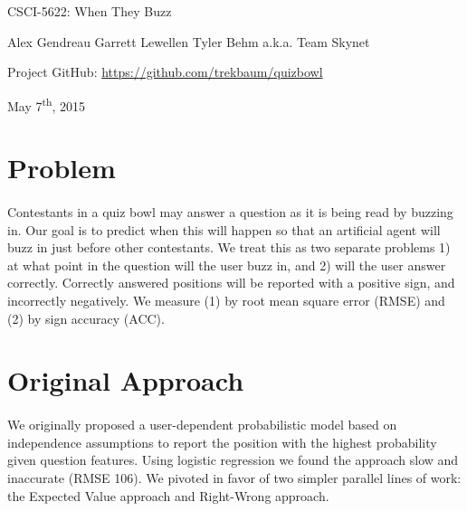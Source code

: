 \documentclass[letterpaper]{article}
\begin{document}
\begin{center}
\LARGE{CSCI-5622: When They Buzz}
\end{center}

\begin{center}
\large{$ $\hfill Alex Gendreau \hfill Garrett Lewellen \hfill Tyler Behm \hfill a.k.a. Team Skynet \hfill $ $}
\end{center}

\begin{center}
	Project GitHub: \href{https://github.com/trekbaum/quizbowl}{https://github.com/trekbaum/quizbowl}
\end{center}

\begin{center}
	May 7\textsuperscript{th}, 2015
\end{center}

\section{Problem}

\paragraph{} Contestants in a quiz bowl may answer a question as it is being read by buzzing in. Our goal is to predict when this will happen so that an artificial agent will buzz in just before other contestants. We treat this as two separate problems 1) at what point in the question will the user buzz in, and 2) will the user answer correctly. Correctly answered positions will be reported with a positive sign, and incorrectly negatively. We measure (1) by root mean square error (RMSE) and (2) by sign accuracy (ACC).

\section{Original Approach}

\paragraph{} We originally proposed a user-dependent probabilistic model based on independence assumptions to report the position with the highest probability given question features. Using logistic regression we found the approach slow and inaccurate (RMSE 106). We pivoted in favor of two simpler parallel lines of work: the Expected Value approach and Right-Wrong approach.
\end{document}
